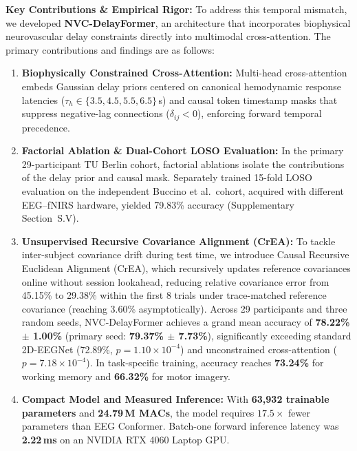 \documentclass[10pt,a4paper]{article}
\begin{document}
\smallskip
\noindent\textbf{Key Contributions \& Empirical Rigor:}
To address this temporal mismatch, we developed \textbf{NVC-DelayFormer}, an architecture that incorporates biophysical neurovascular delay constraints directly into multimodal cross-attention. The primary contributions and findings are as follows:
\begin{enumerate}
  \item \textbf{Biophysically Constrained Cross-Attention:} Multi-head cross-attention embeds Gaussian delay priors centered on canonical hemodynamic response latencies ($\tau_h \in \{3.5, 4.5, 5.5, 6.5\}$\,s) and causal token timestamp masks that suppress negative-lag connections ($\delta_{ij} < 0$), enforcing forward temporal precedence.
  \item \textbf{Factorial Ablation \& Dual-Cohort LOSO Evaluation:} In the primary 29-participant TU Berlin cohort, factorial ablations isolate the contributions of the delay prior and causal mask. Separately trained 15-fold LOSO evaluation on the independent Buccino et al.\ cohort, acquired with different EEG--fNIRS hardware, yielded 79.83\% accuracy (Supplementary Section~S.V).
  \item \textbf{Unsupervised Recursive Covariance Alignment (CrEA):} To tackle inter-subject covariance drift during test time, we introduce Causal Recursive Euclidean Alignment (CrEA), which recursively updates reference covariances online without session lookahead, reducing relative covariance error from 45.15\% to 29.38\% within the first 8 trials under trace-matched reference covariance (reaching 3.60\% asymptotically). Across 29 participants and three random seeds, NVC-DelayFormer achieves a grand mean accuracy of \textbf{78.22\% $\pm$ 1.00\%} (primary seed: \textbf{79.37\% $\pm$ 7.73\%}), significantly exceeding standard 2D-EEGNet (72.89\%, $p = 1.10\times 10^{-4}$) and unconstrained cross-attention ($p = 7.18\times 10^{-4}$). In task-specific training, accuracy reaches \textbf{73.24\%} for working memory and \textbf{66.32\%} for motor imagery.
  \item \textbf{Compact Model and Measured Inference:} With \textbf{63,932 trainable parameters} and \textbf{24.79\,M MACs}, the model requires $17.5\times$ fewer parameters than EEG Conformer. Batch-one forward inference latency was \textbf{2.22\,ms} on an NVIDIA RTX 4060 Laptop GPU.
\end{enumerate}
\end{document}
